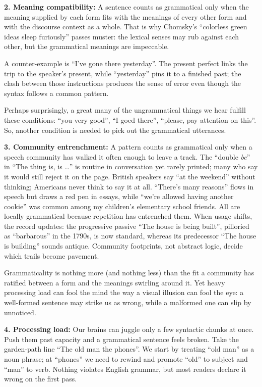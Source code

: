 \documentclass[12pt]{article}
\begin{document}
\textbf{2. Meaning compatibility:}
A sentence counts as grammatical only when the meaning supplied by each form fits with the meanings of every other form and with the discourse context as a whole. That is why Chomsky’s \enquote{colorless green ideas sleep furiously} passes muster: the lexical senses may rub against each other, but the grammatical meanings are impeccable.

A counter-example is \enquote{I’ve gone there yesterday}. The present perfect links the trip to the speaker’s present, while \enquote{yesterday} pins it to a finished past; the clash between those instructions produces the sense of error even though the syntax follows a common pattern.

\smallskip
Perhaps surprisingly, a great many of the ungrammatical things we hear fulfill these conditions: \enquote{you very good}, \enquote{I goed there}, \enquote{please, pay attention on this}. So, another condition is needed to pick out the grammatical utterances.

\textbf{3. Community entrenchment:}  
A pattern counts as grammatical only when a speech community has walked it often enough to leave a track. The \enquote{double \emph{be}} in \enquote{The thing is, is …} is routine in conversation yet rarely printed; many who say it would still reject it on the page. British speakers say \enquote{at the weekend} without thinking; Americans never think to say it at all. \enquote{There's many reasons} flows in speech but draws a red pen in essays, while \enquote{we're allowed having another cookie} was common among my children's elementary school friends. All are locally grammatical because repetition has entrenched them. When usage shifts, the record updates: the progressive passive \enquote{The house is being built}, pilloried as “barbarous” in the 1790s, is now standard, whereas its predecessor \enquote{The house is building} sounds antique. Community footprints, not abstract logic, decide which trails become pavement.

\smallskip
Grammaticality is nothing more (and nothing less) than the fit a community has ratified between a form and the meanings swirling around it. Yet heavy processing load can fool the mind the way a visual illusion can fool the eye: a well-formed sentence may strike us as wrong, while a malformed one can slip by unnoticed.

\textbf{4. Processing load:}  
Our brains can juggle only a few syntactic chunks at once. Push them past capacity and a grammatical sentence feels broken. Take the garden-path line \enquote{The old man the phones}. We start by treating \enquote{old man} as a noun phrase; at \enquote{phones} we need to rewind and promote \enquote{old} to subject and \enquote{man} to verb. Nothing violates English grammar, but most readers declare it wrong on the first pass.
\end{document}
